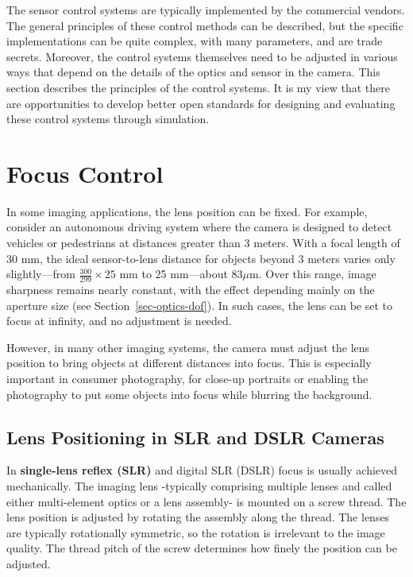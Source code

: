 \documentclass[
  letterpaper,
]{book}
\begin{document}
The sensor control systems are typically implemented by the commercial
vendors. The general principles of these control methods can be
described, but the specific implementations can be quite complex, with
many parameters, and are trade secrets. Moreover, the control systems
themselves need to be adjusted in various ways that depend on the
details of the optics and sensor in the camera. This section describes
the principles of the control systems. It is my view that there are
opportunities to develop better open standards for designing and
evaluating these control systems through simulation.

\section{Focus Control}\label{sec-focus-control}

In some imaging applications, the lens position can be fixed. For
example, consider an autonomous driving system where the camera is
designed to detect vehicles or pedestrians at distances greater than 3
meters. With a focal length of 30 mm, the ideal sensor-to-lens distance
for objects beyond 3 meters varies only slightly---from
\(\frac{300}{299} \times 25\) mm to 25 mm---about \(83 \mu \text{m}\).
Over this range, image sharpness remains nearly constant, with the
effect depending mainly on the aperture size (see
Section~\ref{sec-optics-dof}). In such cases, the lens can be set to
focus at infinity, and no adjustment is needed.

However, in many other imaging systems, the camera must adjust the lens
position to bring objects at different distances into focus. This is
especially important in consumer photography, for close-up portraits or
enabling the photography to put some objects into focus while blurring
the background.

\subsection{Lens Positioning in SLR and DSLR
Cameras}\label{sec-lens-positioning-slr}

In \textbf{single-lens reflex (SLR)} and digital SLR (DSLR) focus is
usually achieved mechanically. The imaging lens -typically comprising
multiple lenses and called either multi-element optics or a lens
assembly- is mounted on a screw thread. The lens position is adjusted by
rotating the assembly along the thread. The lenses are typically
rotationally symmetric, so the rotation is irrelevant to the image
quality. The thread pitch of the screw determines how finely the
position can be adjusted.
\end{document}
